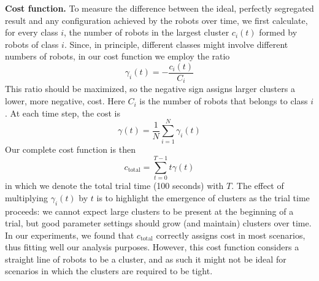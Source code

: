 \documentclass[letterpaper, 10 pt, conference]{ieeeconf}
\newcommand{\myparagraph}[1]{\textbf{#1.}}
\begin{document}
\myparagraph{Cost function}
To measure the difference between the ideal, perfectly segregated result and any
configuration achieved by the robots over time, we first calculate, for every
class $i$, the number of robots in the largest cluster $c_i(t)$ formed by robots of class $i$.  Since,
in principle, different classes might involve different numbers of robots, in
our cost function we employ the ratio
$$
\gamma_i(t) = -\frac{c_i(t)}{C_i}
$$
This ratio should be maximized, so the negative sign assigns larger clusters a lower, more negative, cost.
Here $C_i$ is the number of robots that belongs to class $i$. At each time step, the cost is
$$
\gamma(t) = \frac{1}{N}\sum_{i=1}^N\gamma_i(t)
$$
Our complete cost function is then
\begin{equation}
  \label{eq:cost_function}
  c_{\text{total}} =  \sum_{t=0}^{T-1} t\gamma(t)
\end{equation}
in which we denote the total trial time (100 seconds) with $T$. The effect of multiplying $\gamma_i(t)$ by $t$ is to highlight the
emergence of clusters as the trial time proceeds: we cannot expect large
clusters to be present at the beginning of a trial, but good parameter settings
should grow (and maintain) clusters over time. In our experiments, we found that
$c_{\text{total}}$ correctly assigns cost in most scenarios, thus fitting
well our analysis purposes. However, this cost function considers a straight
line of robots to be a cluster, and as such it might not be ideal for scenarios
in which the clusters are required to be tight.
\end{document}

